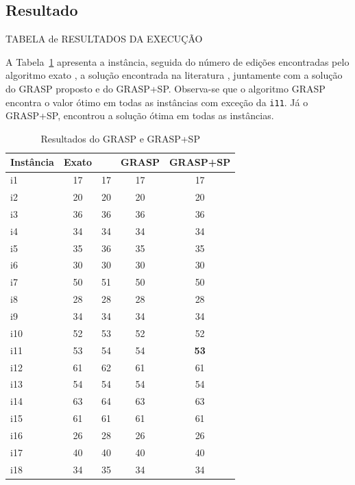 \documentclass[article]{rian_article}
\begin{document}
\subsection{Resultado}

TABELA de RESULTADOS DA EXECUÇÃO

A Tabela~\ref{tab:grasp} apresenta a instância, seguida do número de edições encontradas pelo algoritmo exato \citet{martello2002}, a solução encontrada na literatura \citep{chan1997}, juntamente com a solução do GRASP proposto e do GRASP+SP.
Observa-se que o algoritmo GRASP encontra o valor ótimo em todas as instâncias com exceção da \texttt{i11}.
Já o GRASP+SP, encontrou a solução ótima em todas as instâncias.

\begin{table}[htb]
\caption{Resultados do GRASP e GRASP+SP}
\label{tab:grasp}
\centering
\footnotesize
\begin{tabular}{|l|c|c|c|c|}
\hline
Instância	&Exato    &\citep{chan1997}    & GRASP	& GRASP+SP	\\ \hline
i1	        &17       &17	  & 17		&17		\\ \hline
i2	        &20       &20	  & 20		&20		\\ \hline
i3	        &36       &36	  & 36		&36		\\ \hline
i4	        &34       &34	  & 34		&34		\\ \hline
i5	        &35       &36	  & 35		&35		\\ \hline
i6	        &30       &30	  & 30		&30		\\ \hline
i7	        &50       &51	  & 50		&50		\\ \hline
i8	        &28       &28	  & 28		&28		\\ \hline
i9	        &34       &34	  & 34		&34		\\ \hline
i10	        &52       &53	  & 52		&52		\\ \hline
i11	        &53       &54	  & 54		&\textbf{53}	\\ \hline
i12	        &61       &62	  & 61		&61		\\ \hline
i13	        &54       &54	  & 54		&54		\\ \hline
i14	        &63       &64	  & 63		&63		\\ \hline
i15	        &61       &61	  & 61		&61		\\ \hline
i16         	& 26	  & 28	  & 26		& 26		\\ \hline
i17         	& 40	  & 40	  & 40		& 40		\\ \hline
i18         	& 34	  & 35	  & 34		& 34		\\ \hline

\end{tabular}
\end{table}
\end{document}
